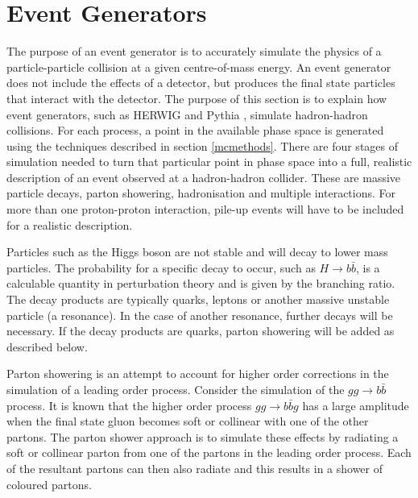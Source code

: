 \section{Event Generators} \label{eventgenerators}

The purpose of an event generator is to accurately simulate the physics of a particle-particle collision at a given centre-of-mass energy. An event generator does not include the effects of a detector, but produces the final state particles that interact with the detector. The purpose of this section is to explain how event generators, such as HERWIG \cite{Corcella:2000bw} and Pythia \cite{Sjostrand:2006za}, simulate hadron-hadron collisions. For each process, a point in the available phase space is generated using the techniques described in section \ref{mcmethods}. There are four stages of simulation needed to turn that particular point in phase space into a full, realistic description of an event observed at a hadron-hadron collider. These are massive particle decays, parton showering, hadronisation and multiple interactions. For more than one proton-proton interaction, pile-up events will have to be included for a realistic description.

Particles such as the Higgs boson are not stable and will decay to lower mass particles. 
The probability for a specific decay to occur, such as $H\rightarrow b\bar{b}$, is a calculable quantity in perturbation theory and is given by the branching ratio. %
The decay products are typically quarks, leptons or another massive unstable particle (a resonance). In the case of another resonance, further decays will be necessary. If the decay products are quarks, parton showering will be added as described below.

Parton showering is an attempt to account for higher order corrections in the simulation of a leading order process. Consider the simulation of the $gg \rightarrow b\bar{b}$ process. It is known that the higher order process $gg \rightarrow b\bar{b}g$ has a large amplitude when the final state gluon becomes soft or collinear with one of the other partons. The parton shower approach is to simulate these effects by radiating a soft or collinear parton from one of the partons in the leading order process. Each of the resultant partons can then also radiate and this results in a shower of coloured partons.

